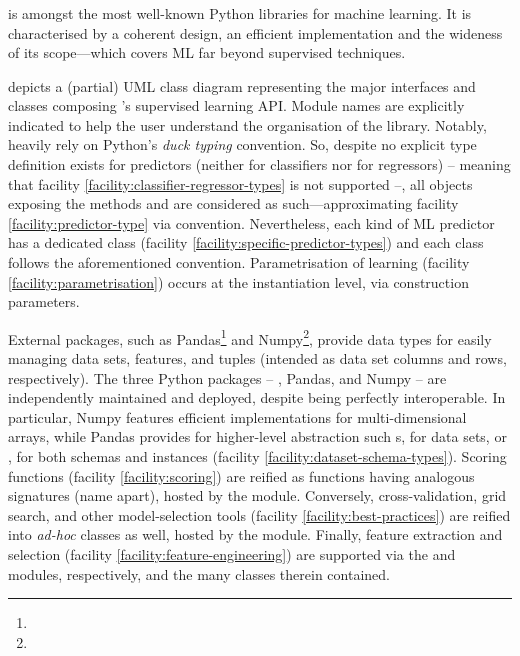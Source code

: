 \documentclass[12pt,a4paper,openright,twoside]{book}
\begin{document}
\subsubsection{\scikit{}}

\scikit{} \cite{PedregosaVGMTGBPWDVPCBPD11} is amongst the most well-known Python libraries for machine learning.
%
It is characterised by a coherent design, an efficient implementation and the wideness of its scope---which covers ML far beyond supervised techniques.

 depicts a (partial) UML class diagram representing the major interfaces and classes composing \scikit's supervised learning API.
%
Module names are explicitly indicated to help the user understand the organisation of the library.
%
Notably, \scikit{} heavily rely on Python's \emph{duck typing} convention.
%
So, despite no explicit type definition exists for predictors (neither for classifiers nor for regressors) -- meaning that facility \cref{facility:classifier-regressor-types} is not supported --, all objects exposing the methods  and  are considered as such---approximating facility \cref{facility:predictor-type} via convention.
%
Nevertheless, each kind of ML predictor has a dedicated class (facility \cref{facility:specific-predictor-types}) and each class follows the aforementioned convention.
%
Parametrisation of learning (facility \cref{facility:parametrisation}) occurs at the instantiation level, via construction parameters.

External packages, such as Pandas\footnote{} and Numpy\footnote{}, provide data types for easily managing data sets, features, and tuples (intended as data set columns and rows, respectively).
%
The three Python packages -- \scikit, Pandas, and Numpy -- are independently maintained and deployed, despite being perfectly interoperable.
%
In particular, Numpy features efficient implementations for multi-dimensional arrays, while Pandas provides for higher-level abstraction such s, for data sets, or , for both schemas and instances (facility \cref{facility:dataset-schema-types}).
%
Scoring functions (facility \ref{facility:scoring}) are reified as functions having analogous signatures (name apart), hosted by the  module.
%
Conversely, cross-validation, grid search, and other model-selection tools (facility \cref{facility:best-practices}) are reified into \emph{ad-hoc} classes as well, hosted by the  module.
%
Finally, feature extraction and selection (facility \cref{facility:feature-engineering}) are supported via the  and  modules, respectively, and the many classes therein contained.
\end{document}
